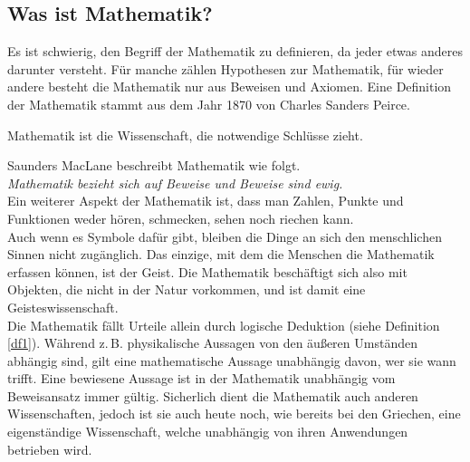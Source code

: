 \subsection{Was ist Mathematik?}
Es ist schwierig, den Begriff der Mathematik zu definieren, da jeder etwas anderes darunter versteht. Für manche zählen Hypothesen zur Mathematik, für wieder andere besteht die Mathematik nur aus Beweisen und Axiomen.
Eine Definition der Mathematik stammt aus dem Jahr 1870 von Charles Sanders Peirce.
\begin{df}
Mathematik ist die Wissenschaft, die notwendige Schlüsse zieht. %
\cite[s. Literaturverzeichnis]{qdf1}
\label{df1}
\end{df}
Saunders MacLane beschreibt Mathematik wie folgt.\\ \textit{Mathematik bezieht sich auf Beweise und Beweise sind ewig.}
\cite[s. Literaturverzeichnis]{qdf2} %
\\ Ein weiterer Aspekt der Mathematik ist, dass man Zahlen, Punkte und Funktionen weder hören, schmecken, sehen noch riechen kann.\\
Auch wenn es Symbole dafür gibt, bleiben die Dinge an sich den menschlichen Sinnen nicht zugänglich.
Das einzige, mit dem die Menschen die Mathematik erfassen können, ist der Geist. Die Mathematik beschäftigt sich also mit Objekten, die nicht in der Natur vorkommen, und ist damit eine Geisteswissenschaft.\\
Die Mathematik fällt Urteile allein durch logische Deduktion (siehe Definition \ref{df1}).
Während z.\,B. physikalische Aussagen von den äußeren Umständen abhängig sind, gilt eine mathematische Aussage unabhängig davon, wer sie wann trifft. Eine bewiesene Aussage ist in der Mathematik unabhängig vom Beweisansatz immer gültig.
Sicherlich dient die Mathematik auch anderen Wissenschaften, jedoch ist sie auch heute noch, wie bereits bei den Griechen, eine eigenständige
Wissenschaft, welche unabhängig von ihren Anwendungen betrieben wird. 

